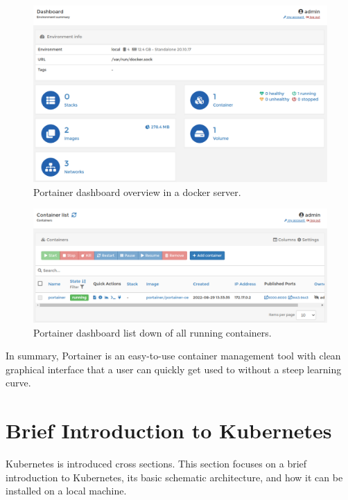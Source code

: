 \begin{figure}
	\centering
	\includegraphics[width=350pt]{chapters/ch-virtualization-and-containerization/figures/portainerdashboard2.png}
	\caption{Portainer dashboard overview in a docker server.} \label{ch:vac:fig:portainerdashboard2}
\end{figure}

\begin{figure}
	\centering
	\includegraphics[width=350pt]{chapters/ch-virtualization-and-containerization/figures/portainerdashboard3.png}
	\caption{Portainer dashboard list down of all running containers.} \label{ch:vac:fig:portainerdashboard3}
\end{figure}

In summary, Portainer is an easy-to-use container management tool with clean graphical interface that a user can quickly get used to without a steep learning curve.

\section{Brief Introduction to Kubernetes}

Kubernetes is introduced cross sections. This section focuses on a brief introduction to Kubernetes, its basic schematic architecture, and how it can be installed on a local machine.

